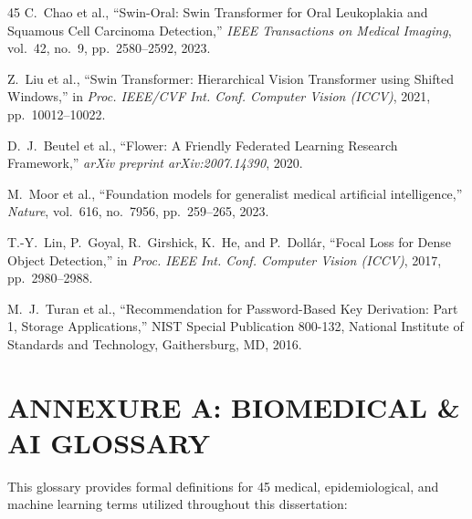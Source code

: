 \documentclass[12pt,a4paper,oneside]{report}
\begin{document}
\begin{thebibliography}{45}
C.~Chao et al., ``Swin-Oral: Swin Transformer for Oral Leukoplakia and Squamous Cell Carcinoma Detection,'' \textit{IEEE Transactions on Medical Imaging}, vol.~42, no.~9, pp.~2580--2592, 2023.

Z.~Liu et al., ``Swin Transformer: Hierarchical Vision Transformer using Shifted Windows,'' in \textit{Proc. IEEE/CVF Int. Conf. Computer Vision (ICCV)}, 2021, pp.~10012--10022.

D.~J.~Beutel et al., ``Flower: A Friendly Federated Learning Research Framework,'' \textit{arXiv preprint arXiv:2007.14390}, 2020.

M.~Moor et al., ``Foundation models for generalist medical artificial intelligence,'' \textit{Nature}, vol.~616, no.~7956, pp.~259--265, 2023.

T.-Y.~Lin, P.~Goyal, R.~Girshick, K.~He, and P.~Doll{\'a}r, ``Focal Loss for Dense Object Detection,'' in \textit{Proc. IEEE Int. Conf. Computer Vision (ICCV)}, 2017, pp.~2980--2988.

M.~J.~Turan et al., ``Recommendation for Password-Based Key Derivation: Part 1, Storage Applications,'' NIST Special Publication 800-132, National Institute of Standards and Technology, Gaithersburg, MD, 2016.

\end{thebibliography}

\appendix

\chapter*{ANNEXURE A: BIOMEDICAL \& AI GLOSSARY}

This glossary provides formal definitions for 45 medical, epidemiological, and machine learning terms utilized throughout this dissertation:
\end{document}
